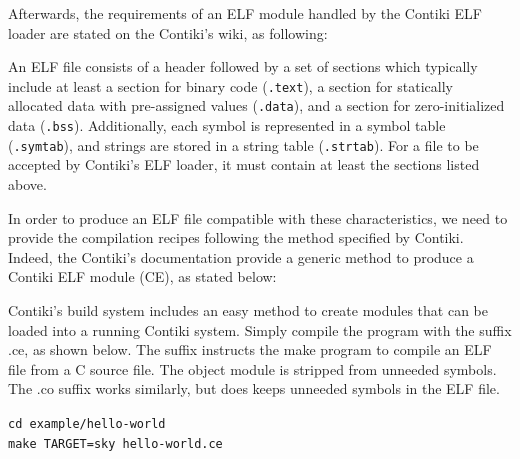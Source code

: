 
Afterwards, the requirements of an ELF module handled by the Contiki ELF loader are stated on the Contiki's wiki, as following:

\begin{citeverbatim}
	An ELF file consists of a header followed by a set of sections which typically include at least a section for binary code (\texttt{.text}), a section for statically allocated data with pre-assigned values (\texttt{.data}), and a section for zero-initialized data (\texttt{.bss}).
	Additionally, each symbol is represented in a symbol table (\texttt{.symtab}), and strings are stored in a string table (\texttt{.strtab}). 
	For a file to be accepted by Contiki's ELF loader, it must contain at least the sections listed above. 
\end{citeverbatim}

In order to produce an ELF file compatible with these characteristics, we need to provide the compilation recipes following the method specified by Contiki.
Indeed, the Contiki's documentation provide a generic method to produce a Contiki ELF module (CE), as stated below:

\begin{citeverbatim}
	Contiki's build system includes an easy method to create modules that can be loaded into a running Contiki system.
	Simply compile the program with the suffix .ce, as shown below. 
	The suffix instructs the make program to compile an ELF file from a C source file. 
	The object module is stripped from unneeded symbols. 
	The .co suffix works similarly, but does keeps unneeded symbols in the ELF file. 
	
	\texttt{cd example/hello-world} \\
	\texttt{make TARGET=sky hello-world.ce}
\end{citeverbatim}

